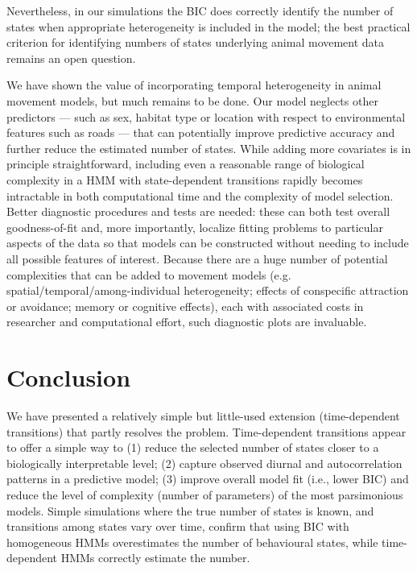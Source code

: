\documentclass{bmcart}
\begin{document}
Nevertheless, in our simulations the BIC does correctly identify
the number of states when appropriate heterogeneity is included
in the model; the best practical criterion for identifying 
numbers of states underlying animal movement data remains an open question.

We have shown the value of incorporating temporal heterogeneity in 
animal movement models, but much remains to be done. 
Our model neglects other predictors --- such as sex, habitat type or
location with respect to environmental features such as roads --- %
that can potentially improve predictive accuracy and 
further reduce the estimated number of states. While adding
more covariates is in principle straightforward, 
including even a reasonable range of biological complexity in 
a HMM with state-dependent transitions rapidly becomes intractable
in both computational time and the complexity of model selection.
Better diagnostic procedures and tests are needed:
these can both test overall goodness-of-fit \cite{potts_generalized_2014} 
and, more importantly, localize fitting problems to particular aspects of the
data so that models can be constructed without needing to
include all possible features of interest. Because there are a huge number of potential complexities that can be added to movement models (e.g. spatial/temporal/among-individual heterogeneity; effects of conspecific attraction or avoidance; memory or cognitive effects), each with associated costs in researcher and computational effort, such diagnostic plots are invaluable.

\section*{Conclusion}

We have presented a relatively simple but little-used extension
(time-dependent transitions) that partly resolves the problem.
Time-dependent transitions appear to offer a simple way to (1) reduce
the selected number of states closer to a biologically interpretable
level; (2) capture observed diurnal and autocorrelation patterns in a
predictive model; (3) improve overall model fit (i.e., lower BIC) and
reduce the level of complexity (number of parameters) of the most
parsimonious models. Simple simulations where the true number of
states is known, and transitions among states vary over time, confirm
that using BIC with homogeneous HMMs overestimates the number of
behavioural states, while time-dependent HMMs correctly estimate
the number.
\end{document}
